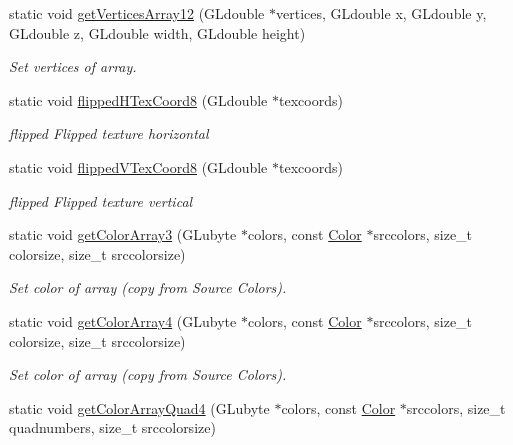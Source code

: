 \begin{DoxyCompactItemize}
static void \hyperlink{class_f2_c_1_1_render_manager_ad231a8a7a0c58a06a4d98b832d87b64c}{getVerticesArray12} (GLdouble $\ast$vertices, GLdouble x, GLdouble y, GLdouble z, GLdouble width, GLdouble height)
\begin{DoxyCompactList}\small\item\em Set vertices of array. \item\end{DoxyCompactList}\item 
static void \hyperlink{class_f2_c_1_1_render_manager_a0ec54810926dfe8ed7513353b9f7952a}{flippedHTexCoord8} (GLdouble $\ast$texcoords)
\begin{DoxyCompactList}\small\item\em flipped Flipped texture horizontal \item\end{DoxyCompactList}\item 
static void \hyperlink{class_f2_c_1_1_render_manager_a264f42f88b777c961b02e25691e3b79e}{flippedVTexCoord8} (GLdouble $\ast$texcoords)
\begin{DoxyCompactList}\small\item\em flipped Flipped texture vertical \item\end{DoxyCompactList}\item 
static void \hyperlink{class_f2_c_1_1_render_manager_a43c2b6fd192ac33b7533686e43abb8f7}{getColorArray3} (GLubyte $\ast$colors, const \hyperlink{class_f2_c_1_1_color}{Color} $\ast$srccolors, size\_\-t colorsize, size\_\-t srccolorsize)
\begin{DoxyCompactList}\small\item\em Set color of array (copy from Source Colors). \item\end{DoxyCompactList}\item 
static void \hyperlink{class_f2_c_1_1_render_manager_a97058b816ab219b1f79fcb7a56833218}{getColorArray4} (GLubyte $\ast$colors, const \hyperlink{class_f2_c_1_1_color}{Color} $\ast$srccolors, size\_\-t colorsize, size\_\-t srccolorsize)
\begin{DoxyCompactList}\small\item\em Set color of array (copy from Source Colors). \item\end{DoxyCompactList}\item 
static void \hyperlink{class_f2_c_1_1_render_manager_a68202074c6474b0c750d74907aa7ea9c}{getColorArrayQuad4} (GLubyte $\ast$colors, const \hyperlink{class_f2_c_1_1_color}{Color} $\ast$srccolors, size\_\-t quadnumbers, size\_\-t srccolorsize)

\end{DoxyCompactItemize}
